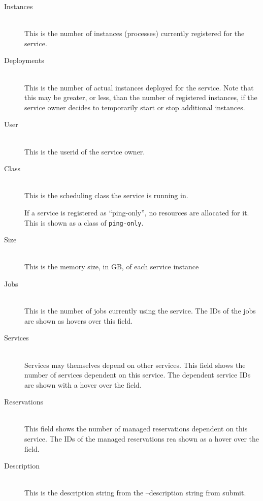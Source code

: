 \begin{description}
            \item[Instances] \hfill \\
              This is the number of instances (processes) currently registered for the service.  

            \item[Deployments] \hfill \\
              This is the number of actual instances deployed for the service.  Note that this may
              be greater, or less, than the number of registered instances, if the service owner
              decides to temporarily start or stop additional instances.

            \item[User] \hfill \\
              This is the userid of the service owner.
              
            \item[Class] \hfill \\
              This is the scheduling class the service is running in. 
              
              If a service is registered as ``ping-only'', no resources are allocated for it.  This
              is shown as a class of {\tt ping-only}.
              
            \item[Size] \hfill \\
              This is the memory size, in GB, of each service instance

            \item[Jobs] \hfill \\
              This is the number of jobs currently using the service.  The IDs of the jobs are
              shown as hovers over this field.

            \item[Services] \hfill \\
              Services may themselves depend on other services.  This field shows the number of
              services dependent on this service.  The dependent service IDs are shown with a 
              hover over the field.

            \item[Reservations] \hfill \\
              This field shows the number of
              managed reservations dependent on this service. The IDs of the managed reservations
              rea shown as a hover over the field.

              
            \item[Description] \hfill \\
              This is the description string from the --description string from submit.
        \end{description}
